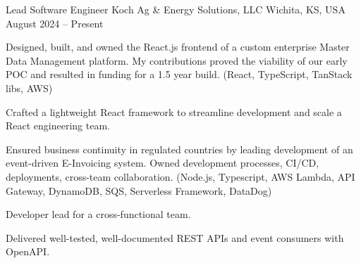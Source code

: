 
\begin{cventries}

	\cventry
	{Lead Software Engineer} %
	{Koch Ag \& Energy Solutions, LLC} %
	{Wichita, KS, USA} %
	{August 2024 -- Present} %
	{
		\begin{cvitems}
			\item Designed, built, and owned the React.js frontend of a custom
			enterprise Master Data Management platform. My contributions proved the
			viability of our early POC and resulted in funding for a 1.5 year build.
			(React, TypeScript, TanStack libs, AWS)
			\item Crafted a lightweight React framework to streamline development and
			scale a React engineering team.
			\item Ensured business continuity in regulated countries by leading
			development of an event-driven E-Invoicing system. Owned development
			processes, CI/CD, deployments, cross-team collaboration. (Node.js,
			Typescript, AWS Lambda, API Gateway, DynamoDB, SQS, Serverless
			Framework, DataDog)
			\item Developer lead for a cross-functional team.
			\item Delivered well-tested, well-documented REST APIs and event consumers with OpenAPI.
		\end{cvitems}
	}


\end{cventries}
